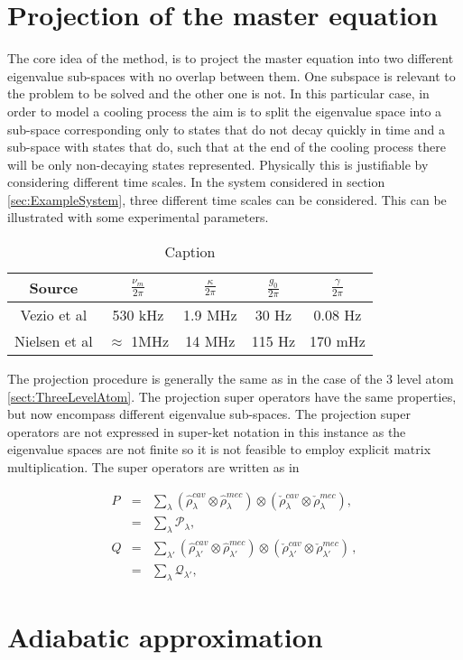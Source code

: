 \documentclass[12pt]{article}
\begin{document}
\section{Projection of the master equation}

The core idea of the method, is to project the master equation into two different eigenvalue sub-spaces with no overlap between them. One subspace is relevant to the problem to be solved and the other one is not. In this particular case, in order to model a cooling process the aim is to split the eigenvalue space into a sub-space corresponding only to states that do not decay quickly in time and a sub-space with states that do, such that at the end of the cooling process there will be only non-decaying states represented. Physically this is justifiable by considering different time scales. In the system considered in section \ref{sec:ExampleSystem}, three different time scales can be considered. This can be illustrated with some experimental parameters.

\begin{table}[]
    \centering
    \begin{tabular}{|c|c|c|c|c|}
        \hline
        Source & $\frac{\nu_m}{2\pi}$ & $\frac{\kappa}{2\pi}$ & $\frac{g_0}{2\pi}$&  $\frac{\gamma}{2\pi}$  \\
        \hline\hline
        Vezio et al \cite{VezioOMExperiment2020} & 530 kHz & 1.9 MHz &  30 Hz & 0.08 Hz \\
        \hline
        Nielsen et al \cite{NielsenMultimodeOptomechanicalMembrane2017} & $\approx$ 1MHz & 14 MHz & 115 Hz & 170 mHz\\
        \hline
    \end{tabular}
    \caption{Caption}
    \label{tab:my_label}
\end{table}

The projection procedure is generally the same as in the case of the 3 level atom \ref{sect:ThreeLevelAtom}. The projection super operators have the same properties, but now encompass different eigenvalue sub-spaces. The projection super operators are not expressed in super-ket notation in this instance as the eigenvalue spaces are not finite so it is not feasible to employ explicit matrix multiplication. The super operators are written as in \cite{YanesOptomechanicalCooling2020}

\begin{eqnarray}
  P &=& \sum_{\lambda} (\hat{\rho}_{\lambda}^{cav}\otimes\hat{\rho}_{\lambda}^{mec})\otimes(\check{\rho}_{\lambda}^{cav}\otimes\check{\rho}_{\lambda}^{mec}),\label{eq:projector_p}\\
  &=& \sum_\lambda \mathcal{P}_\lambda, \nonumber\\
  Q &=& \sum_{\lambda'} (\hat{\rho}_{\lambda'}^{cav}\otimes \hat{\rho}_{\lambda'}^{mec})\otimes(\check{\rho}_{\lambda'}^{cav}\otimes\check{\rho}_{\lambda'}^{mec})\label{eq:projector_q}\, ,\\
  &=& \sum_\lambda \mathcal{Q}_{\lambda'}, \nonumber
\end{eqnarray}

\section{Adiabatic approximation}



\end{document}
